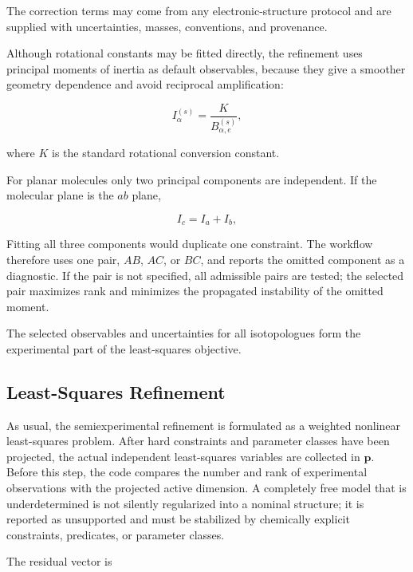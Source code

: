 \documentclass[aip,jcp,reprint,longbibliography,floatfix]{revtex4-2}
\begin{document}
The correction terms may come from any electronic-structure
protocol and are supplied with uncertainties, masses, conventions, and
provenance.\cite{Mendolicchio2025FastDvib}

Although rotational constants may be fitted directly, the refinement uses
principal moments of inertia as default observables, because they give a smoother
geometry dependence and avoid reciprocal amplification:

\begin{equation}
I_{\alpha}^{(s)}
=
\frac{K}
{B_{\alpha,e}^{(s)}},
\end{equation}

where $K$ is the standard rotational conversion constant.

For planar molecules only two principal components are independent. If the
molecular plane is the $ab$ plane,

\begin{equation}
I_c = I_a + I_b ,
\end{equation}

Fitting all three components would duplicate one constraint. The workflow
therefore uses one pair, $AB$, $AC$, or $BC$, and reports the omitted component
as a diagnostic. If the pair is not specified, all admissible pairs are tested;
the selected pair maximizes rank and minimizes the propagated instability of
the omitted moment.

The selected observables and uncertainties for all isotopologues form the
experimental part of the least-squares objective.


\subsection{Least-Squares Refinement}

As usual,\cite{Demaison2007EquilibriumReview,Demaison2011EquilibriumStructures,Mendolicchio2017MSR}
the semiexperimental refinement is formulated as a weighted nonlinear
least-squares problem.
After hard constraints and parameter classes have been projected, the actual independent
least-squares variables are collected in $\mathbf{p}$.
Before this step, the code compares the number and rank of experimental
observations with the projected active dimension. A completely free model that
is underdetermined is not silently regularized into a nominal structure; it is
reported as unsupported and must be stabilized by chemically explicit
constraints, predicates, or parameter classes.

The residual vector is
\end{document}
